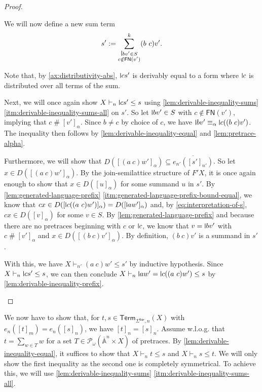 \documentclass[a4paper,UKenglish,cleveref,thm-restate,numberwithinsect,final]{lipics-v2021}
\newcommand{\Br}{\mathsf{bar}}
\newcommand{\Term}{\mathsf{Term}}
\newcommand{\FN}{\mathsf{FN}}
\newcommand{\Names}{\mathbb{A}}
\newcommand{\barNames}{\overline{\Names}}
\newcommand{\alphaeq}{\equiv_\alpha}
\newcommand{\pow}{\mathcal{P}}
\newcommand{\powf}{\pow_{\omega}}
\newcommand{\fresh}{\mathbin{\#}}
\theoremstyle{plain}
\newcommand{\midmid}{\hspace{0.2ex}{\rule[-0.1ex]{0.6pt}{1.65ex}}\hspace{0.2ex}}
\newcommand{\newletter}[1]{{\midmid}#1}
\numberwithin{equation}{section}
\newcommand{\+}[1]{\mathcal{#1}\xspace}
\theoremstyle{definition}
\begin{document}
\begin{proof}
\begin{itemize}
        We will now define a new sum term
        \begin{equation*}
          s' := \sum_{\substack{\newletter{b}v' \in S \\ c \notin \FN(v')}}^k (b\ c)v'.
        \end{equation*}

        Note that, by \eqref{ax:distributivity-abs}, \(\newletter{c}s'\) is derivably equal to a form where \(\newletter{c}\) is distributed over all terms of the sum.

        Next, we will once again show \(X \vdash_n \newletter{c}s' \le s\) using \cref{lem:derivable-inequality-sums} \eqref{itm:derivable-inequality-sums-all} on \(s'\).
        So let \(\newletter{b}v' \in S\) with \(c \notin \FN(v')\), implying that \(c \fresh [v']_\alpha\).
        Since \(b \neq c\) by choice of \(c\), we have \(\newletter{b}v' \alphaeq \newletter{c}((b\ c)v')\).
        The inequality then follows by \cref{lem:derivable-inequality-equal} and \cref{lem:pretrace-alpha}.

        Furthermore, we will show that \(D([(a\ c)w']_\alpha) \subseteq \overline{e_{n'}([s']_{n'})}\).
        So let \(x \in D([(a\ c)w']_\alpha)\).
        By the join-semilattice structure of \(F' X\), it is once again enough to show that \(x \in D([u]_\alpha)\) for some summand \(u\) in \(s'\).
        By \cref{lem:generated-language-prefix} \eqref{itm:generated-language-prefix-bound-equal}, we know that \(cx \in D([\newletter{c}((a\ c)w')]_\alpha) = D([\newletter{a}w']_\alpha)\) and, by \eqref{eq:interpretation-of-s}, \(cx \in D([v]_\alpha)\) for some \(v \in S\).
        By \cref{lem:generated-language-prefix} and because there are no pretraces beginning with \(c\) or \(\newletter{c}\), we know that \(v = \newletter{b}v'\) with \(c \fresh [v']_\alpha\) and \(x \in D([(b\ c)v']_\alpha)\).
        By definition, \((b\ c)v'\) is a summand in \(s'\).

        With this, we have \(X \vdash_{n'} (a\ c)w' \le s'\) by inductive hypothesis.
        Since \(X \vdash_n \newletter{c}s' \le s\), we can then conclude \(X \vdash_n \newletter{a}w' = \newletter{c}((a\ c)w') \le s\) by \cref{lem:derivable-inequality-prefix}.
  \end{itemize}
\end{proof}

\noindent We now have to show that, for \(t, s \in \Term_{\Sigma^\Br, n}(X)\) with \(e_n([t]_m) = e_n([s]_n)\), we have \([t]_n = [s]_n\).
Assume w.l.o.g. that \(t = \sum_{w \in T} w\) for a set \(T \in \powf(\barNames^n \times X)\) of pretraces.
By \cref{lem:derivable-inequality-equal}, it suffices to show that \(X \vdash_n t \le s\) and \(X \vdash_n s \le t\).
We will only show the first inequality as the second one is completely symmetrical.
To achieve this, we will use \cref{lem:derivable-inequality-sums} \eqref{itm:derivable-inequality-sums-all}.
\end{document}
